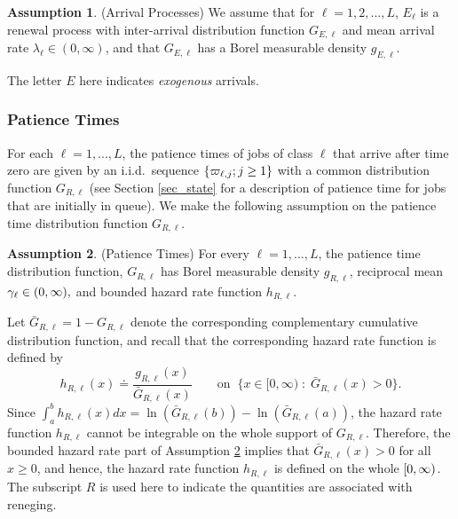 \documentclass{article}
\theoremstyle{definition}
\newtheorem{assumption}{Assumption}[part]
\numberwithin{equation}{section}
\begin{document}
\begin{assumption}\label{asm_arrival}
(Arrival Processes) We assume that for $\ell=1,2,...,L$, $E_\ell$ is a renewal process with inter-arrival distribution function $G_{E,\ell}$ and mean arrival rate $\lambda_\ell\in(0,\infty)$, and that $G_{E,\ell}$ has a Borel measurable density $g_{E,\ell}$.
\end{assumption}
\noindent The letter $E$ here indicates \textit{exogenous} arrivals. 

\subsubsection*{Patience Times}
For each $\ell=1,...,L$, the patience times of jobs of class $\ell$ that arrive after time zero are given by an i.i.d.\ sequence $\{\varpi_{\ell,j};j\geq1\}$ with a common distribution function $G_{R,\ell}$ (see Section \ref{sec_state} for a description of patience time for jobs that are initially in queue). We make the following assumption on the patience time distribution function $G_{R,\ell}$.
\begin{assumption}\label{asm_patience}
  (Patience Times) For every $\ell=1,...,L$, the patience time distribution function, $G_{R,\ell}$ has Borel measurable density $g_{R,\ell}$, reciprocal mean $\gamma_{\ell}\in(0,\infty),$ and bounded hazard rate function $h_{R,\ell}$.
\end{assumption}
Let $\bar G_{R,\ell}=1-G_{R,\ell}$ denote the corresponding complementary cumulative distribution function, and recall that the corresponding hazard rate function is defined by
\[
h_{R,\ell}(x)\doteq\frac{g_{R,\ell}(x)}{\bar G_{R,\ell}(x)}\quad\quad \text{on} \;\;\{x\in[0,\infty)\;:\; \bar G_{R,\ell}(x)> 0\}.
\]
Since $\int_a^bh_{R,\ell}(x)dx = \ln(\bar G_{R,\ell}(b)) - \ln(\bar G_{R,\ell}(a))$, the hazard rate function $h_{R,\ell}$ cannot be integrable on the whole support of $G_{R,\ell}$. Therefore, the bounded hazard rate part of Assumption \ref{asm_patience} implies that  $\bar G_{R,\ell}(x)>0$ for all $x\geq0$, and hence, the hazard rate function $h_{R,\ell}$ is defined on the whole $[0,\infty)$. The subscript $R$ is used here to indicate the quantities are associated with reneging. 
\end{document}
